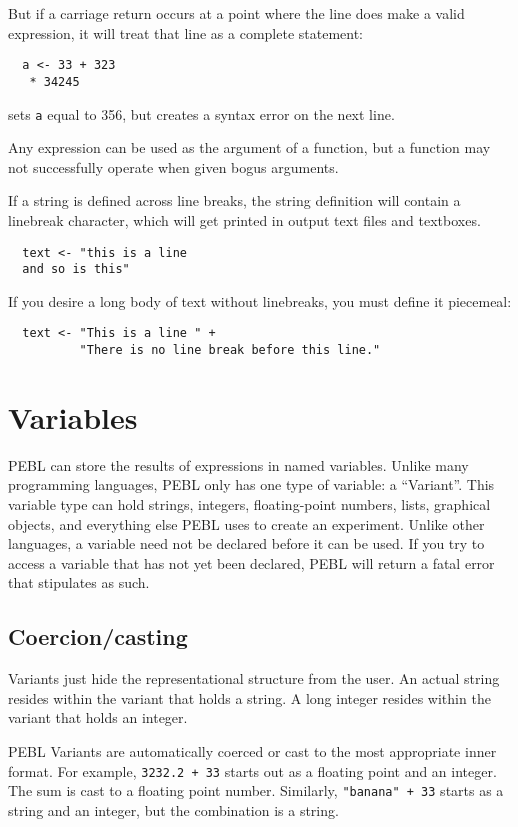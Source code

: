 But if a carriage return occurs at a point where the
line does make a valid expression, it will treat that line as a complete statement:
\begin{verbatim}
  a <- 33 + 323
   * 34245
\end{verbatim}
sets \texttt{a} equal to 356, but creates a syntax error on the next line.

Any expression can be used as the argument of a function, but a
function may not successfully operate when given bogus arguments.


If a string is defined across line breaks, the string definition will
contain a linebreak character, which will get printed in output text
files and textboxes.

\begin{verbatim}
  text <- "this is a line
  and so is this"
\end{verbatim}
If you desire a long body of text without linebreaks, you must define it piecemeal:
\begin{verbatim}
  text <- "This is a line " +
          "There is no line break before this line."
\end{verbatim}




\section{Variables}

PEBL can store the results of expressions in
named variables.  Unlike many programming languages, PEBL
only has one type of variable: a ``Variant''. This variable
type can hold strings, integers, floating-point numbers, lists,
graphical objects, and everything else PEBL uses to create an
experiment.  Unlike other languages, a variable need not be
declared before it can be used.  If you try to access a variable that
has not yet been declared, PEBL will return a fatal error that stipulates as such.


\subsection{Coercion/casting}

Variants  just hide the representational structure
from the user. An actual string resides within the variant that holds a string. A long integer resides within the variant that holds an integer.

PEBL Variants are automatically coerced or cast to the
most appropriate inner format.  For example, \texttt{3232.2 + 33}
starts out as a floating point and an integer.  The sum is
cast to a floating point number. Similarly, \texttt{"banana" + 33}
starts as a string and an integer, but the combination is a string.


